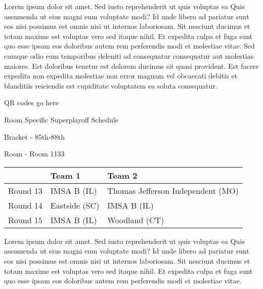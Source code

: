 \documentclass{article}%
\begin{document}
Lorem ipsum dolor sit amet. Sed iusto reprehenderit ut quis voluptas ea Quis assumenda ut eius magni eum voluptate modi? Id unde libero ad pariatur sunt eos nisi possimus est omnis nisi ut internos laboriosam. Sit nesciunt ducimus et totam maxime est voluptas vero sed itaque nihil. Et expedita culpa et fuga sunt quo esse ipsam eos doloribus autem rem perferendis modi et molestiae vitae.\newline%
\newline%
Sed cumque odio eum temporibus deleniti ad consequatur consequatur aut molestias maiores. Est doloribus tenetur est dolorem ducimus sit quasi provident. Est facere expedita non expedita molestiae non error magnam vel obcaecati debitis et blanditiis reiciendis est cupiditate voluptatem ea soluta consequatur.%
\vspace*{140pt}%
\begin{center}%
\begin{Huge}%
QR codes go here%
\end{Huge}%
\end{center}%
\newpage%
\begin{center}%
\begin{Huge}%
Room Specific Superplayoff Schedule%
\end{Huge}%
\vspace*{8pt}%
\linebreak%
\begin{Large}%
Bracket {-} 85th{-}88th%
\end{Large}%
\vspace*{8pt}%
\linebreak%
\vspace*{8pt}%
\begin{Large}%
Room {-} Room 1133%
\end{Large}%
\end{center}%
%
\begin{tabularx}{\textwidth}{|c|Y|Y|}%
\hline%
&Team 1&Team 2\\%
\hline%
Round 13&IMSA B (IL)&Thomas Jefferson Independent (MO)\\%
Round 14&Eastside (SC)&IMSA B (IL)\\%
Round 15&IMSA B (IL)&Woodland (CT)\\%
\hline%
\end{tabularx}%
\vspace*{8pt}%
\newline%
Lorem ipsum dolor sit amet. Sed iusto reprehenderit ut quis voluptas ea Quis assumenda ut eius magni eum voluptate modi? Id unde libero ad pariatur sunt eos nisi possimus est omnis nisi ut internos laboriosam. Sit nesciunt ducimus et totam maxime est voluptas vero sed itaque nihil. Et expedita culpa et fuga sunt quo esse ipsam eos doloribus autem rem perferendis modi et molestiae vitae.\newline%
\end{document}
